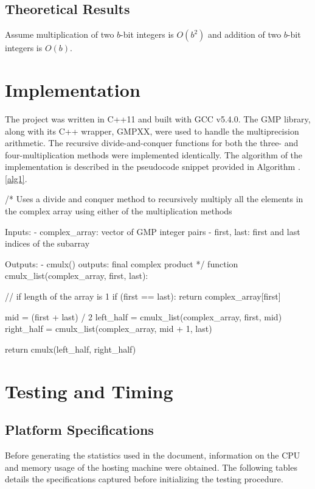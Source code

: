 \documentclass[usletter, 12pt]{article}
\begin{document}
        \subsection{Theoretical Results}
        Assume multiplication of two $b$-bit integers is $O(b^{2})$ and addition of two $b$-bit integers is $O(b)$.

    \section{Implementation}
    The project was written in C++11 and built with GCC v5.4.0. The GMP library, along with its C++ wrapper, GMPXX, were used to handle the multiprecision arithmetic. The recursive divide-and-conquer functions for both the three- and four-multiplication methods were implemented identically. The algorithm of the implementation is described in the pseudocode snippet provided in Algorithm \thesection.\ref{alg1}.

\begin{pseudocode}[caption={Divide and Conquer Multiplication}, label={alg1}]
/*
Uses a divide and conquer method to recursively multiply all the elements in
the complex array using either of the multiplication methods

Inputs:
    - complex_array: vector of GMP integer pairs
    - first, last: first and last indices of the subarray

Outputs:
    - cmulx() outputs: final complex product
*/
function cmulx_list(complex_array, first, last):

    // if length of the array is 1
    if (first == last):
        return complex_array[first]

    mid = (first + last) / 2
    left_half = cmulx_list(complex_array, first, mid)
    right_half = cmulx_list(complex_array, mid + 1, last)

    return cmulx(left_half, right_half)

\end{pseudocode}

    \section{Testing and Timing}

        \subsection{Platform Specifications}
        Before generating the statistics used in the document, information on the CPU and memory usage of the hosting machine were obtained. The following tables details the specifications captured before initializing the testing procedure.
\end{document}
